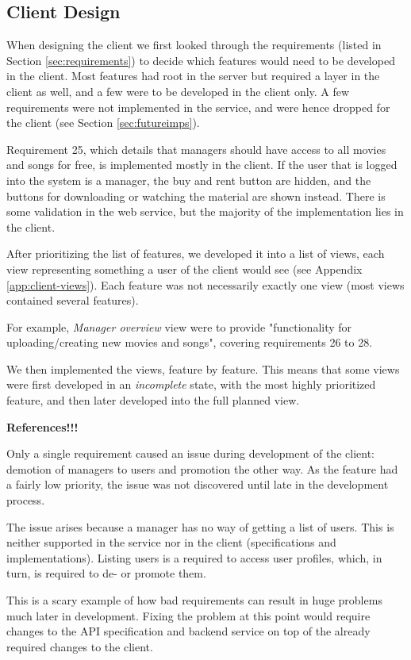 \subsection{Client Design}

When designing the client we first looked through the requirements (listed in
Section \ref{sec:requirements}) to decide which features would need to be
developed in the client. Most features had root in the server but required a
layer in the client as well, and a few were to be developed in the client only.
A few requirements were not implemented in the service, and were hence dropped
for the client (see Section \ref{sec:futureimps}).

Requirement 25, which details that managers should have access to
all movies and songs for free, is implemented mostly in the client. If the user
that is logged into the system is a manager, the buy and rent button are hidden,
and the buttons for downloading or watching the material are shown instead. There
is some validation in the web service, but the majority of the implementation lies
in the client.

After prioritizing the list of features, we developed it into a list of views,
each view representing something a user of the client would see (see Appendix
\ref{app:client-views}). Each feature was not necessarily exactly one view (most
views contained several features).

For example, \emph{Manager overview} view were to provide "functionality
for uploading/creating new movies and songs", covering requirements 26 to 28.

We then implemented the views, feature by feature. This means that some views
were first developed in an \emph{incomplete} state, with the most highly
prioritized feature, and then later developed into the full planned view.

\textbf{References!!!}

Only a single requirement caused an issue during development of the client:
demotion of managers to users and promotion the other way. As the feature
had a fairly low priority, the issue was not discovered until late in the
development process.

The issue arises because a manager has no way of getting a list of users. This
is neither supported in the service nor in the client (specifications and
implementations). Listing users is a required to access user profiles, which, in
turn, is required to de- or promote them.

This is a scary example of how bad requirements can result in huge problems much
later in development. Fixing the problem at this point would require changes to
the API specification and backend service on top of the already required changes
to the client.

